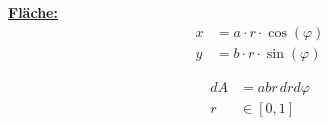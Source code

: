     \begin{minipage}{0.49\linewidth}
        \textbf{\underline{Fläche:}}
            \begin{align*}
                x &= a \cdot r \cdot \cos(\varphi)\\
                y &= b \cdot r \cdot \sin(\varphi)
            \end{align*}
    \end{minipage}
    \begin{minipage}{0.5\linewidth}
        \vspace{0.8em}
        \begin{align*}
            dA &= abr \, dr d\varphi\\
            r &\in [0,1]
        \end{align*}
    \end{minipage}
        